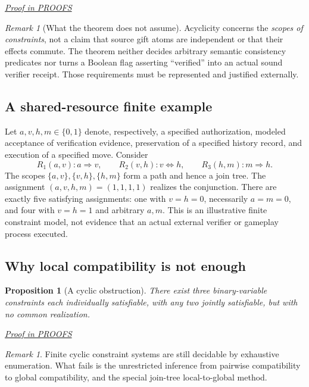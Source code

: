 \documentclass[11pt,letterpaper]{article}
\newtheorem{proposition}[theorem]{Proposition}
\theoremstyle{definition}\newtheorem{definition}[theorem]{Definition}\newtheorem{example}[theorem]{Example}
\theoremstyle{remark}\newtheorem{remark}[theorem]{Remark}
\newcommand{\prooflink}[1]{\par\noindent\hfill\small\hyperref[#1]{\textit{Proof in PROOFS}}\normalsize}
\begin{document}
\label{br:compat:stmt:1}\prooflink{br:compat:proof:1}


\begin{remark}[What the theorem does not assume]
Acyclicity concerns the \emph{scopes of constraints}, not a claim that source gift atoms are independent or that their effects commute. The theorem neither decides arbitrary semantic consistency predicates nor turns a Boolean flag asserting ``verified'' into an actual sound verifier receipt. Those requirements must be represented and justified externally.
\end{remark}

\subsection{A shared-resource finite example}
Let \(a,v,h,m\in\{0,1\}\) denote, respectively, a specified authorization, modeled acceptance of verification evidence, preservation of a specified history record, and execution of a specified move. Consider
\[
R_1(a,v): a\Rightarrow v,\qquad
R_2(v,h): v\Leftrightarrow h,\qquad
R_3(h,m):m\Rightarrow h.
\]
The scopes \(\{a,v\},\{v,h\},\{h,m\}\) form a path and hence a join tree. The assignment
\( (a,v,h,m)=(1,1,1,1) \) realizes the conjunction. There are exactly five satisfying assignments: one with \(v=h=0\), necessarily \(a=m=0\), and four with \(v=h=1\) and arbitrary \(a,m\). This is an illustrative finite constraint model, not evidence that an actual external verifier or gameplay process executed.

\subsection{Why local compatibility is not enough}
\begin{proposition}[A cyclic obstruction]
There exist three binary-variable constraints each individually satisfiable, with any two jointly satisfiable, but with no common realization.
\end{proposition}
\label{br:compat:stmt:2}\prooflink{br:compat:proof:2}


\begin{remark}
Finite cyclic constraint systems are still decidable by exhaustive enumeration. What fails is the unrestricted inference from pairwise compatibility to global compatibility, and the special join-tree local-to-global method.
\end{remark}
\end{document}
